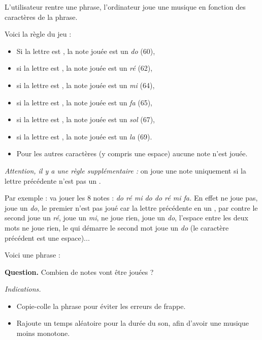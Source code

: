 \documentclass[class=report,crop=false, 12pt]{standalone}
\begin{document}
\begin{enigme}

L'utilisateur rentre une phrase, l'ordinateur joue une musique en fonction des caractères de la phrase.

\medskip

Voici la règle du jeu :
\begin{itemize}
  \item Si la lettre est , la note jouée est un \emph{do} (60),
  \item si la lettre est , la note jouée est un \emph{ré} (62), 
  \item si la lettre est , la note jouée est un \emph{mi} (64),
  \item si la lettre est , la note jouée est un \emph{fa} (65),   
  \item si la lettre est , la note jouée est un \emph{sol} (67),
  \item si la lettre est , la note jouée est un \emph{la} (69).
  \item Pour les autres caractères (y compris une espace) aucune note n'est jouée.    
\end{itemize}

\medskip

\emph{Attention, il y a une règle supplémentaire :} on joue une note uniquement si la lettre précédente n'est pas un .

\bigskip

Par exemple :  va jouer les 8 notes : \emph{do ré mi do do ré mi fa.} En effet
 ne joue pas,  joue un \emph{do},
le premier  n'est pas joué car la lettre précédente en un , par contre le second  joue un \emph{ré},  joue un \emph{mi},
 ne joue rien,  joue un \emph{do}, l'espace entre les deux mots ne joue rien, le  qui démarre le second mot joue un \emph{do} (le caractère précédent est une espace)...


\bigskip

Voici une phrase :
\begin{center}
\begin{minipage}{0.8\textwidth}
\center
{}
\end{minipage}
\end{center}


\textbf{Question.} Combien de notes vont être jouées ?

\bigskip

\emph{Indications.}
\begin{itemize}
  \item Copie-colle la phrase pour éviter les erreurs de frappe.
  \item Rajoute un temps aléatoire pour la durée du son, afin d'avoir une musique moins monotone.
\end{itemize}


\end{enigme}
\end{document}
